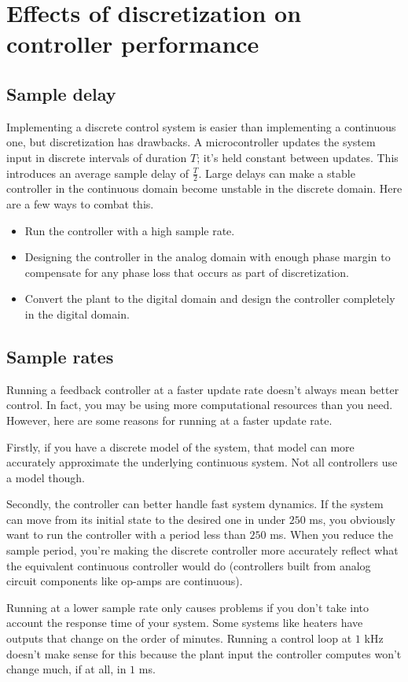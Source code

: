 \section{Effects of discretization on controller performance}

\subsection{Sample delay}

Implementing a discrete control system is easier than implementing a continuous
one, but \gls{discretization} has drawbacks. A microcontroller updates the
system input in discrete intervals of duration $T$; it's held constant between
updates. This introduces an average sample delay of $\frac{T}{2}$. Large delays
can make a stable controller in the continuous domain become unstable in the
discrete domain. Here are a few ways to combat this.
\begin{itemize}
  \item Run the controller with a high sample rate.
  \item Designing the controller in the analog domain with enough
    \gls{phase margin} to compensate for any phase loss that occurs as part of
    \gls{discretization}.
  \item Convert the \gls{plant} to the digital domain and design the controller
    completely in the digital domain.
\end{itemize}

\subsection{Sample rates}

Running a feedback controller at a faster update rate doesn't always mean better
control. In fact, you may be using more computational resources than you need.
However, here are some reasons for running at a faster update rate.

Firstly, if you have a discrete \gls{model} of the \gls{system}, that
\gls{model} can more accurately approximate the underlying continuous
\gls{system}. Not all controllers use a \gls{model} though.

Secondly, the controller can better handle fast \gls{system} dynamics. If the
\gls{system} can move from its initial state to the desired one in under $250$
ms, you obviously want to run the controller with a period less than $250$ ms.
When you reduce the sample period, you're making the discrete controller more
accurately reflect what the equivalent continuous controller would do
(controllers built from analog circuit components like op-amps are continuous).

Running at a lower sample rate only causes problems if you don't take into
account the response time of your \gls{system}. Some \glspl{system} like heaters
have \glspl{output} that change on the order of minutes. Running a control loop
at $1$ kHz doesn't make sense for this because the \gls{plant} \gls{input} the
controller computes won't change much, if at all, in $1$ ms.
